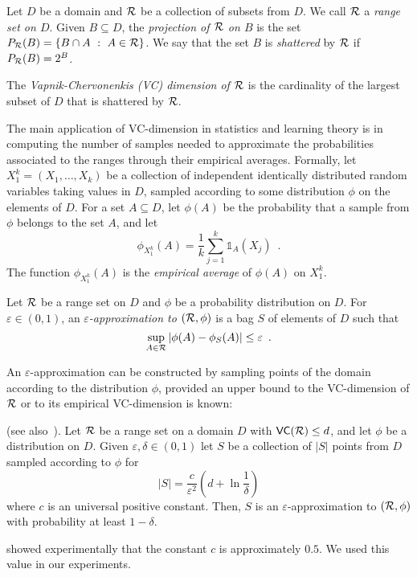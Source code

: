 Let $D$ be a domain and $\mathcal{R}$ be a collection of subsets from $D$. We call
$\mathcal{R}$ a \emph{range set on $D$}.
Given $B\subseteq D$, the \emph{projection of $\mathcal{R}$ on $B$} is the set 
$P_{\mathcal{R}}(B)=\{ B\cap A ~:~ A\in\mathcal{R}\}$. We say that the set $B$ is
\emph{shattered} by $\mathcal{R}$ if $P_{\mathcal{R}}(B)=2^B$.

\begin{definition}\label{def:vcdim}
  The \emph{Vapnik-Chervonenkis (VC) dimension of $\mathcal{R}$} is the cardinality
  of the largest subset of $D$ that is shattered by $\mathcal{R}$.
\end{definition}

The main application of VC-dimension in statistics and learning
theory is in computing the number of samples needed to approximate the
probabilities associated to the ranges through their empirical averages.
Formally, let $X_1^k=(X_1,\dotsc,X_k)$ be a collection of independent
identically distributed random variables taking values in $D$, sampled 
according to some distribution $\phi$ on the elements of $D$.
For a set $A\subseteq D$, let $\phi(A)$ be the probability that a sample from
$\phi$ belongs to the set $A$, and let
\[
\phi_{X_1^k}(A)=\frac{1}{k}\sum_{j=1}^k\mathds{1}_A(X_j)\enspace.%
\]
The function
$\phi_{X_1^k}(A)$ is the \emph{empirical average} of $\phi(A)$ on $X_1^k$.

\begin{definition}\label{def:eapprox}
  Let $\mathcal{R}$ be a range set on %
  $D$ and $\phi$ be a probability distribution on $D$. For $\varepsilon\in(0,1)$,
  an \emph{$\varepsilon$-approximation to $(\mathcal{R},\phi)$} is a bag $S$ of
  elements of $D$ such that 
  \[
  \sup_{A\in\mathcal{R}}|\phi(A)-\phi_S(A)|\le\varepsilon\enspace.\]
\end{definition}

An $\varepsilon$-approximation can be constructed by sampling points of
the domain according to the distribution $\phi$, provided an upper bound to the
VC-dimension of $\mathcal{R}$ or to its empirical VC-dimension is known:

\begin{theorem}\label{thm:eapprox}
  (see also~\citep{LiLS01}). Let $\mathcal{R}$ be a range set on a domain $D$ with
  $\mathsf{VC}(\mathcal{R})\le d$, and let $\phi$ be a distribution on $D$. Given
  $\varepsilon,\delta\in(0,1)$ let $S$ be a collection of $|S|$ points from $D$
  sampled according to $\phi$ for
  \begin{equation}\label{eq:vceapprox}
	|S|=\frac{c}{\varepsilon^2}\left(d+\ln\frac{1}{\delta}\right)
  \end{equation}
  where $c$ is an universal positive constant. Then, $S$ is an
  $\varepsilon$-approximation to $(\mathcal{R},\phi)$ with probability at least
  $1-\delta$.
\end{theorem}
\citet{LofflerP09} showed experimentally that the constant $c$ is approximately
$0.5$. We used this value in our experiments.

